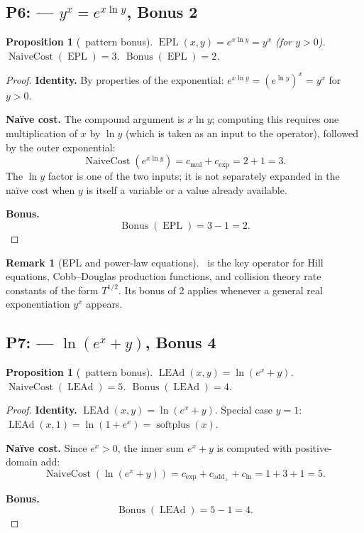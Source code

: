 \documentclass[12pt,a4paper]{article}
\newtheorem{proposition}[theorem]{Proposition}
\theoremstyle{definition}
\newtheorem{remark}[theorem]{Remark}
\newcommand{\LEAd}{\operatorname{LEAd}}
\newcommand{\EPL}{\operatorname{EPL}}
\newcommand{\NC}{\operatorname{NaiveCost}}
\newcommand{\Bonus}{\operatorname{Bonus}}
\begin{document}
\subsection{P6: \EPL --- $y^x = e^{x \ln y}$, Bonus 2}
\label{sub:P6}

\begin{proposition}[\EPL\ pattern bonus]
\label{prop:P6}
$\EPL(x,y) = e^{x \ln y} = y^x$ (for $y > 0$).
$\NC(\EPL) = 3$. $\Bonus(\EPL) = 2$.
\end{proposition}

\begin{proof}
\textbf{Identity.} By properties of the exponential:
$e^{x \ln y} = (e^{\ln y})^x = y^x$ for $y > 0$.

\textbf{Na\"{i}ve cost.} The compound argument is $x \ln y$; computing
this requires one multiplication of $x$ by $\ln y$ (which is taken as an
input to the operator), followed by the outer exponential:
\[
  \NC(e^{x \ln y}) = c_{\mathrm{mul}} + c_{\exp} = 2 + 1 = 3.
\]
The $\ln y$ factor is one of the two inputs; it is not separately
expanded in the na\"{i}ve cost when $y$ is itself a variable or a value
already available.

\textbf{Bonus.}
\[
  \Bonus(\EPL) = 3 - 1 = 2.
\]
\end{proof}

\begin{remark}[EPL and power-law equations]
\EPL\ is the key operator for Hill equations, Cobb--Douglas production
functions, and collision theory rate constants of the form $T^{1/2}$.
Its bonus of 2 applies whenever a general real exponentiation $y^x$
appears.
\end{remark}

\subsection{P7: \LEAd --- $\ln(e^x + y)$, Bonus 4}
\label{sub:P7}

\begin{proposition}[\LEAd\ pattern bonus]
\label{prop:P7}
$\LEAd(x,y) = \ln(e^x + y)$.
$\NC(\LEAd) = 5$. $\Bonus(\LEAd) = 4$.
\end{proposition}

\begin{proof}
\textbf{Identity.} $\LEAd(x,y) = \ln(e^x + y)$.  Special case $y=1$:
$\LEAd(x,1) = \ln(1 + e^x) = \operatorname{softplus}(x)$.

\textbf{Na\"{i}ve cost.} Since $e^x > 0$, the inner sum $e^x + y$ is
computed with positive-domain add:
\[
  \NC(\ln(e^x + y)) = c_{\exp} + c_{\mathrm{add}_+} + c_{\ln}
                    = 1 + 3 + 1 = 5.
\]

\textbf{Bonus.}
\[
  \Bonus(\LEAd) = 5 - 1 = 4.
\]
\end{proof}
\end{document}

